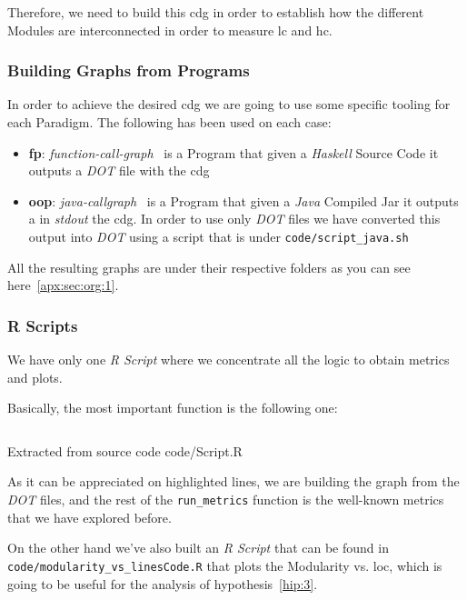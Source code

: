 \documentclass[12pt, a4paper]{article}
\begin{document}
Therefore, we need to build this \acrlong{cdg} in order to establish how the different Modules are interconnected in order to measure \acrshort{lc} and \acrshort{hc}.

\subsubsection{Building Graphs from Programs}
In order to achieve the desired \acrlong{cdg} we are going to use some specific tooling for each Paradigm.
The following has been used on each case:

\begin{itemize}
    \item \textbf{\acrlong{fp}}: \textit{function-call-graph}~\cite{fp_callgraph} is a Program that given a \textit{Haskell} Source Code it outputs a \textit{DOT} file with the \acrlong{cdg}
    \item \textbf{\acrlong{oop}}: \textit{java-callgraph}~\cite{java_callgraph} is a Program that given a \textit{Java} Compiled Jar it outputs a in \textit{stdout} the \acrlong{cdg}. In order to use only \textit{DOT} files we have converted this output into \textit{DOT} using a script that is under \texttt{code/script_java.sh}
\end{itemize}

All the resulting graphs are under their respective folders as you can see here~\ref{apx:sec:org:1}.

\subsubsection{R Scripts}
We have only one \textit{R Script} where we concentrate all the logic to obtain metrics and plots. 

Basically, the most important function is the following one:

\begin{listing}[H]
    \inputminted[firstline=18, lastline=46, breaklines, highlightlines={19-23}]{R}{../code/Solution.R}
    \caption{Extracted from source code code/Script.R}
    \label{src:script:1}
\end{listing}
  
As it can be appreciated on highlighted lines, we are building the graph from the \textit{DOT} files, 
and the rest of the \texttt{run_metrics} function is the well-known metrics that we have explored before.   

On the other hand we've also built an \textit{R Script} that can be found in \texttt{code/modularity_vs_linesCode.R} 
that plots the Modularity vs. \acrlong{loc}, which is going to be useful for the analysis of hypothesis~\ref{hip:3}.
\end{document}
